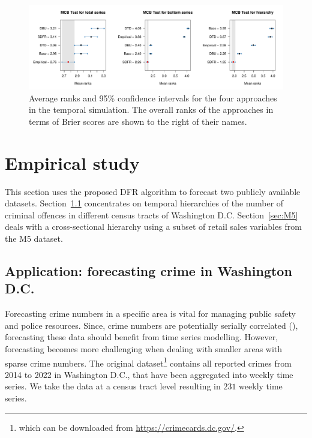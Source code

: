 \documentclass[a4paper,review,12pt,authoryear]{elsarticle}
\theoremstyle{definition}
\begin{document}
     \begin{figure}
       \caption{\label{fig:sim_temporal_mcb_prob}Average ranks and 95\% confidence intervals for the four approaches in the temporal simulation. The overall ranks of the approaches in terms of Brier scores are shown to the right of their names.}
       \includegraphics[width=\textwidth]{figures/temporal_mcb.pdf}
     \end{figure}

     \section{Empirical study}
     \label{sec:application}
     This section uses the proposed DFR algorithm to forecast two publicly available datasets.
     Section~\ref{sec:application_crime} concentrates on temporal hierarchies of the number of criminal offences in different census tracts of Washington D.C.
     Section~\ref{sec:M5} deals with a cross-sectional hierarchy using a subset of retail sales variables from the M5 dataset.

     \subsection{Application: forecasting crime in Washington D.C.}
     \label{sec:application_crime}

     Forecasting crime numbers in a specific area is vital for managing public safety and police resources. Since, crime numbers are potentially serially correlated (\citealp{aldor-noimanSpatioTemporalLowCount2013}), forecasting these data should benefit from time series modelling.
     However, forecasting becomes more challenging when dealing with smaller areas with sparse crime numbers.
     The original dataset\footnote{which can be downloaded from \url{https://crimecards.dc.gov/}.} contains all reported crimes from 2014 to 2022 in Washington D.C., that have been aggregated into weekly time series. We take the data at a census tract level resulting in $231$ weekly time series. 
\end{document}
